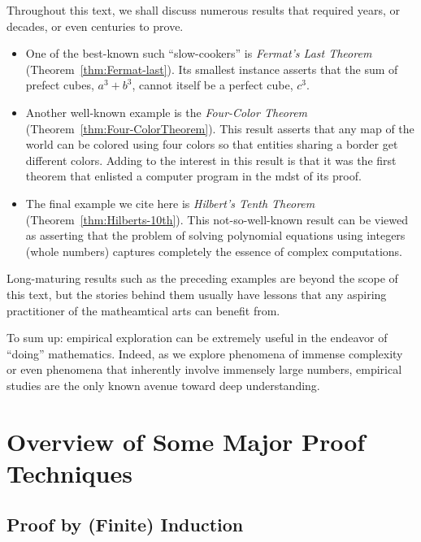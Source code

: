Throughout this text, we shall discuss numerous results that required
years, or decades, or even centuries to prove.
\begin{itemize}
\item
One of the best-known such ``slow-cookers'' is {\it Fermat's Last
  Theorem} (Theorem~\ref{thm:Fermat-last}).  Its smallest instance
asserts that the sum of prefect cubes, $a^3 + b^3$, cannot itself be a
perfect cube, $c^3$.
\item
Another well-known example is the {\it Four-Color Theorem}
(Theorem~\ref{thm:Four-ColorTheorem}).  This result asserts that any
map of the world can be colored using four colors so that entities
sharing a border get different colors.  Adding to the interest in this
result is that it was the first theorem that enlisted a computer
program in the mdst of its proof.
\item
The final example we cite here is {\it Hilbert's Tenth Theorem}
(Theorem~\ref{thm:Hilberts-10th}).  This not-so-well-known result can
be viewed as asserting that the problem of solving polynomial
equations using integers (whole numbers) captures completely the
essence of complex computations.
\end{itemize}
Long-maturing results such as the preceding examples are beyond the
scope of this text, but the stories behind them usually have lessons
that any aspiring practitioner of the matheamtical arts can benefit
from.

To sum up: empirical exploration can be extremely useful in the
endeavor of ``doing'' mathematics.  Indeed, as we explore phenomena of
immense complexity or even phenomena that inherently involve immensely
large numbers, empirical studies are the only known avenue toward deep
understanding.


 


\section{Overview of Some Major Proof Techniques}
\label{sec:major-proof-techniques}

\subsection{Proof by (Finite) Induction}
\label{sec:Induction}

